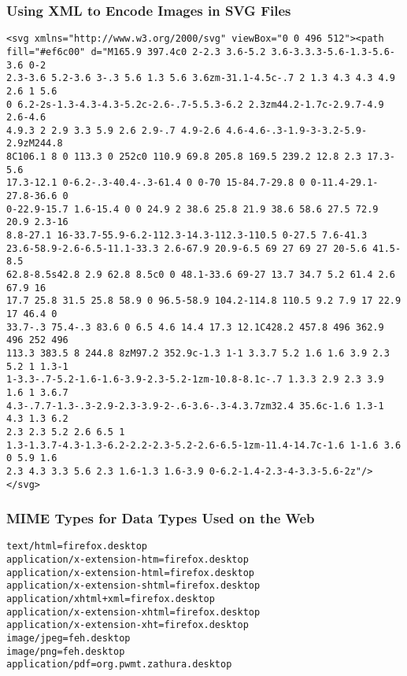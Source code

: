 \documentclass[14pt,aspectratio=169]{beamer}
\begin{document}
%
\begin{frame}[fragile]
  \frametitle{Using XML to Encode Images in SVG Files}
  \normalsize
  \begin{minipage}{6in}
    \vspace*{.05in}
    \begin{verbatim}
<svg xmlns="http://www.w3.org/2000/svg" viewBox="0 0 496 512"><path
fill="#ef6c00" d="M165.9 397.4c0 2-2.3 3.6-5.2 3.6-3.3.3-5.6-1.3-5.6-3.6 0-2
2.3-3.6 5.2-3.6 3-.3 5.6 1.3 5.6 3.6zm-31.1-4.5c-.7 2 1.3 4.3 4.3 4.9 2.6 1 5.6
0 6.2-2s-1.3-4.3-4.3-5.2c-2.6-.7-5.5.3-6.2 2.3zm44.2-1.7c-2.9.7-4.9 2.6-4.6
4.9.3 2 2.9 3.3 5.9 2.6 2.9-.7 4.9-2.6 4.6-4.6-.3-1.9-3-3.2-5.9-2.9zM244.8
8C106.1 8 0 113.3 0 252c0 110.9 69.8 205.8 169.5 239.2 12.8 2.3 17.3-5.6
17.3-12.1 0-6.2-.3-40.4-.3-61.4 0 0-70 15-84.7-29.8 0 0-11.4-29.1-27.8-36.6 0
0-22.9-15.7 1.6-15.4 0 0 24.9 2 38.6 25.8 21.9 38.6 58.6 27.5 72.9 20.9 2.3-16
8.8-27.1 16-33.7-55.9-6.2-112.3-14.3-112.3-110.5 0-27.5 7.6-41.3
23.6-58.9-2.6-6.5-11.1-33.3 2.6-67.9 20.9-6.5 69 27 69 27 20-5.6 41.5-8.5
62.8-8.5s42.8 2.9 62.8 8.5c0 0 48.1-33.6 69-27 13.7 34.7 5.2 61.4 2.6 67.9 16
17.7 25.8 31.5 25.8 58.9 0 96.5-58.9 104.2-114.8 110.5 9.2 7.9 17 22.9 17 46.4 0
33.7-.3 75.4-.3 83.6 0 6.5 4.6 14.4 17.3 12.1C428.2 457.8 496 362.9 496 252 496
113.3 383.5 8 244.8 8zM97.2 352.9c-1.3 1-1 3.3.7 5.2 1.6 1.6 3.9 2.3 5.2 1 1.3-1
1-3.3-.7-5.2-1.6-1.6-3.9-2.3-5.2-1zm-10.8-8.1c-.7 1.3.3 2.9 2.3 3.9 1.6 1 3.6.7
4.3-.7.7-1.3-.3-2.9-2.3-3.9-2-.6-3.6-.3-4.3.7zm32.4 35.6c-1.6 1.3-1 4.3 1.3 6.2
2.3 2.3 5.2 2.6 6.5 1
1.3-1.3.7-4.3-1.3-6.2-2.2-2.3-5.2-2.6-6.5-1zm-11.4-14.7c-1.6 1-1.6 3.6 0 5.9 1.6
2.3 4.3 3.3 5.6 2.3 1.6-1.3 1.6-3.9 0-6.2-1.4-2.3-4-3.3-5.6-2z"/></svg>
    \end{verbatim}
  \end{minipage}
\end{frame}

%
\begin{frame}[fragile]
  \frametitle{MIME Types for Data Types Used on the Web}
  \normalsize
  \begin{minipage}{6in}
    \vspace*{.05in}
    \begin{verbatim}
text/html=firefox.desktop
application/x-extension-htm=firefox.desktop
application/x-extension-html=firefox.desktop
application/x-extension-shtml=firefox.desktop
application/xhtml+xml=firefox.desktop
application/x-extension-xhtml=firefox.desktop
application/x-extension-xht=firefox.desktop
image/jpeg=feh.desktop
image/png=feh.desktop
application/pdf=org.pwmt.zathura.desktop
    \end{verbatim}
  \end{minipage}
\end{frame}
\end{document}
